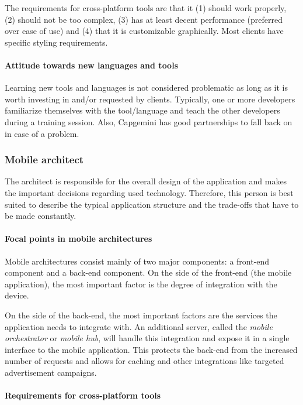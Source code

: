 The requirements for cross-platform tools are that it (1) should work properly, (2) should not be too complex, (3) has at least decent performance (preferred over ease of use) and (4) that it is customizable graphically. Most clients have specific styling requirements.

\paragraph{Attitude towards new languages and tools} 

Learning new tools and languages is not considered problematic as long as it is worth investing in and/or requested by clients. Typically, one or more developers familiarize themselves with the tool/language and teach the other developers during a training session. Also, Capgemini has good partnerships to fall back on in case of a problem. 

\subsubsection{Mobile architect}

The architect is responsible for the overall design of the application and makes the important decisions regarding used technology. Therefore, this person is best suited to describe the typical application structure and the trade-offs that have to be made constantly.

\paragraph{Focal points in mobile architectures} 

Mobile architectures consist mainly of two major components: a front-end component and a back-end component. On the side of the front-end (the mobile application), the most important factor is the degree of integration with the device.

On the side of the back-end, the most important factors are the services the application needs to integrate with. An additional server, called the \emph{mobile orchestrator} or \emph{mobile hub}, will handle this integration and expose it in a single interface to the mobile application. This protects the back-end from the increased number of requests and allows for caching and other integrations like targeted advertisement campaigns.

\paragraph{Requirements for cross-platform tools}

